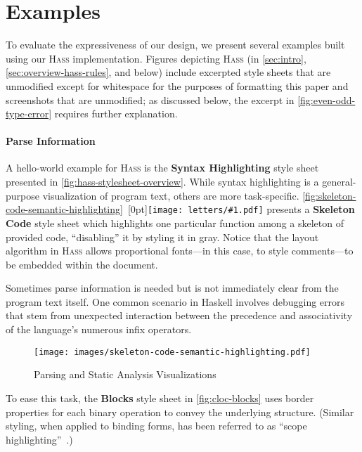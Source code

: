 \documentclass[acmsmall, screen]{acmart}
\newcommand{\parahead}[1]
  {\paragraph{\textbf{#1}}}
\newcommand{\hass}
{\textsc{Hass}}
\newcommand{\figBubble}[1]{\raisebox{-0.03in}[0pt]{\texttt{[image: letters/\#1.pdf]}}}
\newcommand{\refBubble}[1]
  {~\figBubble{#1}}
\begin{document}
 
\section{Examples}
\label{sec:evaluation}

To evaluate the expressiveness of our design, we present several examples built using our \hass{} implementation.
Figures depicting \hass{} (in \autoref{sec:intro}, \autoref{sec:overview-hass-rules}, and below) include excerpted style sheets that are unmodified except for whitespace for the purposes of formatting this paper and screenshots that are unmodified; as discussed below, the excerpt in \autoref{fig:even-odd-type-error} requires further explanation.




\newcommand{\exampleName}[1]
  {\textbf{#1}}

\parahead{Parse Information}









A hello-world example for \hass{} is the \exampleName{Syntax Highlighting} style sheet presented in \autoref{fig:hass-stylesheet-overview}.
While syntax highlighting is a general-purpose
visualization of program text, others are more {task-specific}.
\autoref{fig:skeleton-code-semantic-highlighting}\refBubble{a} presents a \exampleName{Skeleton Code} style sheet which
highlights one particular function among a skeleton of provided code,
``disabling'' it by styling it in gray.
Notice that the layout algorithm in \hass{} allows proportional fonts---in this case, to style comments---to be embedded within the document.



Sometimes parse information is needed but is not immediately clear from the program text itself.
One common scenario in Haskell involves debugging errors that stem from unexpected interaction between the precedence and associativity of the language's numerous infix operators.\begin{wrapfigure}[30]{r}{2.7in}
  \vspace{-0.04in} \texttt{[image: images/skeleton-code-semantic-highlighting.pdf]}
  \caption{Parsing and Static Analysis Visualizations}
  \label{fig:skeleton-code-semantic-highlighting}
\end{wrapfigure}
 To ease this task, the \exampleName{Blocks} style sheet in \autoref{fig:cloc-blocks} uses border properties for each binary operation to convey the underlying structure.
(Similar styling, when applied to binding forms, has been referred to as ``scope highlighting''~\cite{Brown2023}.)
\end{document}
